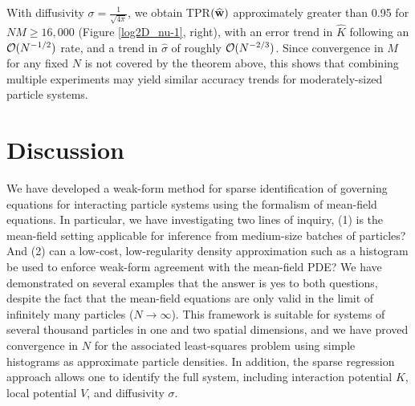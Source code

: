 \documentclass[english,reqno]{amsart}
\begin{document}
With diffusivity $\sigma=\frac{1}{\sqrt{4\pi}}$, we obtain TPR$({\widehat{\mathbf{w}}})$ approximately greater than 0.95 for $NM\geq 16,000$ (Figure \ref{log2D_nu-1}, right), with an error trend in $\widehat{K}$ following an ${\mathcal{O}}(N^{-1/2})$ rate, and a trend in $\widehat{\sigma}$ of roughly ${\mathcal{O}}(N^{-2/3})$. Since convergence in $M$ for any fixed $N$ is not covered by the theorem above, this shows that combining multiple experiments may yield similar accuracy trends for moderately-sized particle systems. 

\section{Discussion}\label{sec:discussion}

We have developed a weak-form method for sparse identification of governing equations for interacting particle systems using the formalism of mean-field equations. In particular, we have investigating two lines of inquiry, (1) is the mean-field setting applicable for inference from medium-size batches of particles? And (2) can a low-cost, low-regularity density approximation such as a histogram be used to enforce weak-form agreement with the mean-field PDE? We have demonstrated on several examples that the answer is yes to both questions, despite the fact that the mean-field equations are only valid in the limit of infinitely many particles ($N\to \infty$). This framework is suitable for systems of several thousand particles in one and two spatial dimensions, and we have proved convergence in $N$ for the associated least-squares problem using simple histograms as approximate particle densities. In addition, the sparse regression approach allows one to identify the full system, including interaction potential $K$, local potential $V$, and diffusivity $\sigma$.\\
\end{document}
